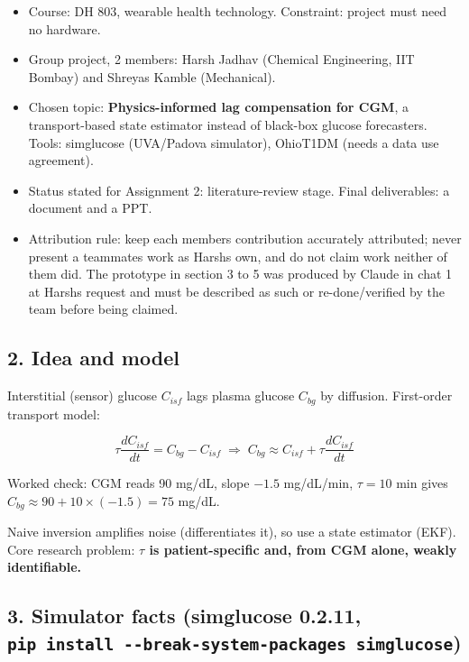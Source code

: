 \documentclass[11pt,a4paper]{article}
\providecommand{\tightlist}{\setlength{\itemsep}{0pt}\setlength{\parskip}{0pt}}
\begin{document}
\begin{itemize}
\tightlist
\item
  Course: DH 803, wearable health technology. Constraint: project must
  need no hardware.
\item
  Group project, 2 members: Harsh Jadhav (Chemical Engineering, IIT
  Bombay) and Shreyas Kamble (Mechanical).
\item
  Chosen topic: \textbf{Physics-informed lag compensation for CGM}, a
  transport-based state estimator instead of black-box glucose
  forecasters. Tools: simglucose (UVA/Padova simulator), OhioT1DM (needs
  a data use agreement).
\item
  Status stated for Assignment 2: literature-review stage. Final
  deliverables: a document and a PPT.
\item
  Attribution rule: keep each member\textquotesingle s contribution
  accurately attributed; never present a teammate\textquotesingle s work
  as Harsh\textquotesingle s own, and do not claim work neither of them
  did. The prototype in section 3 to 5 was produced by Claude in chat 1
  at Harsh\textquotesingle s request and must be described as such or
  re-done/verified by the team before being claimed.
\end{itemize}

\hypertarget{2-idea-and-model}{%
\subsection{2. Idea and model}\label{2-idea-and-model}}

Interstitial (sensor) glucose \(C_{isf}\) lags plasma glucose \(C_{bg}\)
by diffusion. First-order transport model:

\[\tau \frac{dC_{isf}}{dt} = C_{bg} - C_{isf} \;\Rightarrow\; C_{bg} \approx C_{isf} + \tau \frac{dC_{isf}}{dt}\]

Worked check: CGM reads 90 mg/dL, slope \(-1.5\) mg/dL/min,
\(\tau = 10\) min gives \(C_{bg} \approx 90 + 10\times(-1.5) = 75\)
mg/dL.

Naive inversion amplifies noise (differentiates it), so use a state
estimator (EKF). Core research problem: \textbf{\(\tau\) is
patient-specific and, from CGM alone, weakly identifiable.}

\hypertarget{3-simulator-facts-simglucose-0211-pip-install---break-system-packages-simglucose}{%
\subsection{\texorpdfstring{3. Simulator facts (simglucose 0.2.11,
\texttt{pip\ install\ -\/-break-system-packages\ simglucose})}{3. Simulator facts (simglucose 0.2.11, pip install -\/-break-system-packages simglucose)}}\label{3-simulator-facts-simglucose-0211-pip-install---break-system-packages-simglucose}}
\end{document}
